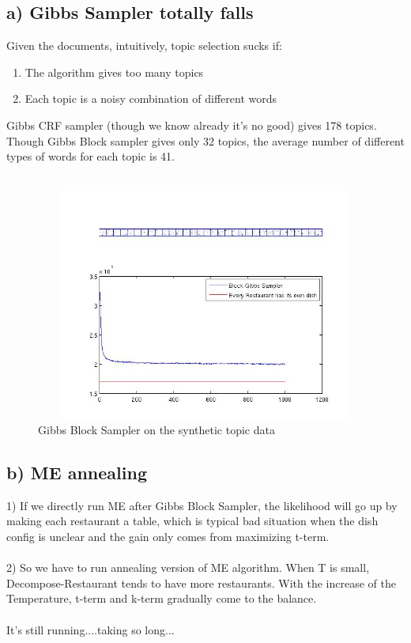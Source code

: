 \documentclass{article}
\begin{document}
\begin{spacing}{1.1}
\subsection{a) Gibbs Sampler totally falls}
Given the documents, intuitively, topic selection sucks if:
\begin{enumerate}
 \item The algorithm gives too many topics
 \item Each topic is a noisy combination of different words
\end{enumerate}
Gibbs CRF sampler (though we know already it's no good) gives 178 topics.\\
Though Gibbs Block sampler gives only 32 topics, the average number of different types of words for each topic is 41.\\ \\
\begin{figure}
 \centering
     \includegraphics[width=5in,height=3in]{topic_block.jpg}
    \caption{Gibbs Block Sampler on the synthetic topic data}
    \label{fig:by:table} 
\end{figure}
\newpage
\subsection{b) ME annealing}
1) If we directly run ME after Gibbs Block Sampler, the likelihood will go up by making each restaurant a table, which is typical
bad situation when the dish config is unclear and the gain only comes from maximizing t-term.\\ \\
2) So we have to run annealing version of ME algorithm. When T is small, Decompose-Restaurant tends to have more restaurants. 
With the increase of the Temperature, t-term and k-term gradually come to the balance. \\ \\
It's still running....taking so long...
\end{spacing}
\end{document}
